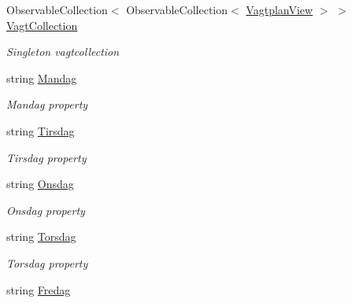 \begin{DoxyCompactItemize}
\item 
Observable\+Collection$<$ Observable\+Collection$<$ \hyperlink{class__1aarsproeve_1_1_model_1_1_vagtplan_view}{Vagtplan\+View} $>$ $>$ \hyperlink{class__1aarsproeve_1_1_view_model_1_1_vagtplan_view_model_a9e4c70e38d1e11a24616387ee8188381}{Vagt\+Collection}
\begin{DoxyCompactList}\small\item\em Singleton vagtcollection \end{DoxyCompactList}\item 
string \hyperlink{class__1aarsproeve_1_1_view_model_1_1_vagtplan_view_model_aa78a723e55f22d0579a6a5cc0086a2fc}{Mandag}
\begin{DoxyCompactList}\small\item\em Mandag property \end{DoxyCompactList}\item 
string \hyperlink{class__1aarsproeve_1_1_view_model_1_1_vagtplan_view_model_a504d0377b323ec2af99d27a0b586924a}{Tirsdag}
\begin{DoxyCompactList}\small\item\em Tirsdag property \end{DoxyCompactList}\item 
string \hyperlink{class__1aarsproeve_1_1_view_model_1_1_vagtplan_view_model_a4d544dfd8109650066d5e9d25642c352}{Onsdag}
\begin{DoxyCompactList}\small\item\em Onsdag property \end{DoxyCompactList}\item 
string \hyperlink{class__1aarsproeve_1_1_view_model_1_1_vagtplan_view_model_a8ae90390ac0ead14c7542bb1b735ec75}{Torsdag}
\begin{DoxyCompactList}\small\item\em Torsdag property \end{DoxyCompactList}\item 
string \hyperlink{class__1aarsproeve_1_1_view_model_1_1_vagtplan_view_model_a7da74e228f974d9756603957477f65da}{Fredag}

\end{DoxyCompactItemize}
